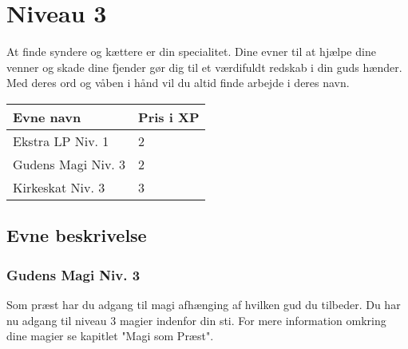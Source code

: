 \chapter{Niveau 3}
At finde syndere og kættere er din specialitet. Dine evner til at hjælpe dine venner og skade dine fjender gør dig til et værdifuldt redskab i din guds hænder. Med deres ord og våben i hånd vil du altid finde arbejde i deres navn.

\begin{table}[H]
    \centering
    \begin{tabular}{|p{}|p{}|}
    \rowcolor{cerulean!80}\hline
        Evne navn & Pris i XP \\\hline
            Ekstra LP Niv. 1 & 2\\\hline
            Gudens Magi Niv. 3 & 2\\\hline
            Kirkeskat Niv. 3 & 3\\\hline
    \end{tabular}
\end{table}

\section{Evne beskrivelse}



\subsection{Gudens Magi Niv. 3}
Som præst har du adgang til magi afhænging af hvilken gud du tilbeder. Du har nu adgang til niveau 3 magier indenfor din sti. For mere information omkring dine magier se kapitlet "Magi som Præst".

